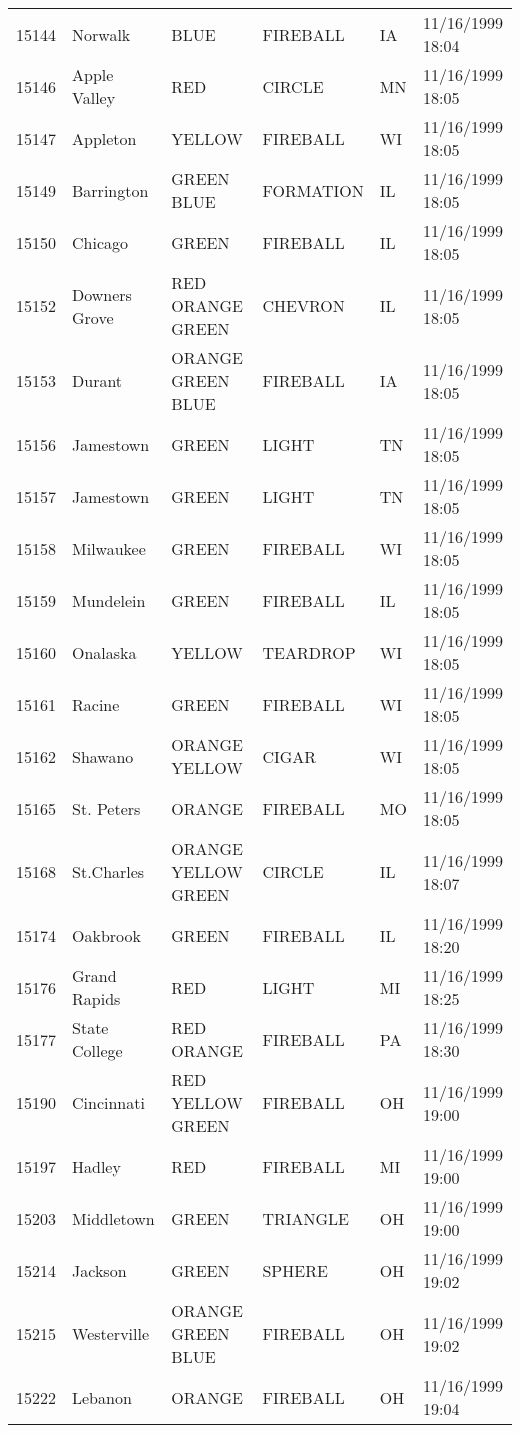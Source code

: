 \begin{tabular}{llllll}
15144 & Norwalk & BLUE & FIREBALL & IA & 11/16/1999 18:04 \\
15146 & Apple Valley & RED & CIRCLE & MN & 11/16/1999 18:05 \\
15147 & Appleton & YELLOW & FIREBALL & WI & 11/16/1999 18:05 \\
15149 & Barrington & GREEN BLUE & FORMATION & IL & 11/16/1999 18:05 \\
15150 & Chicago & GREEN & FIREBALL & IL & 11/16/1999 18:05 \\
15152 & Downers Grove & RED ORANGE GREEN & CHEVRON & IL & 11/16/1999 18:05 \\
15153 & Durant & ORANGE GREEN BLUE & FIREBALL & IA & 11/16/1999 18:05 \\
15156 & Jamestown & GREEN & LIGHT & TN & 11/16/1999 18:05 \\
15157 & Jamestown & GREEN & LIGHT & TN & 11/16/1999 18:05 \\
15158 & Milwaukee & GREEN & FIREBALL & WI & 11/16/1999 18:05 \\
15159 & Mundelein & GREEN & FIREBALL & IL & 11/16/1999 18:05 \\
15160 & Onalaska & YELLOW & TEARDROP & WI & 11/16/1999 18:05 \\
15161 & Racine & GREEN & FIREBALL & WI & 11/16/1999 18:05 \\
15162 & Shawano & ORANGE YELLOW & CIGAR & WI & 11/16/1999 18:05 \\
15165 & St. Peters & ORANGE & FIREBALL & MO & 11/16/1999 18:05 \\
15168 & St.Charles & ORANGE YELLOW GREEN & CIRCLE & IL & 11/16/1999 18:07 \\
15174 & Oakbrook & GREEN & FIREBALL & IL & 11/16/1999 18:20 \\
15176 & Grand Rapids & RED & LIGHT & MI & 11/16/1999 18:25 \\
15177 & State College & RED ORANGE & FIREBALL & PA & 11/16/1999 18:30 \\
15190 & Cincinnati & RED YELLOW GREEN & FIREBALL & OH & 11/16/1999 19:00 \\
15197 & Hadley & RED & FIREBALL & MI & 11/16/1999 19:00 \\
15203 & Middletown & GREEN & TRIANGLE & OH & 11/16/1999 19:00 \\
15214 & Jackson & GREEN & SPHERE & OH & 11/16/1999 19:02 \\
15215 & Westerville & ORANGE GREEN BLUE & FIREBALL & OH & 11/16/1999 19:02 \\
15222 & Lebanon & ORANGE & FIREBALL & OH & 11/16/1999 19:04 \\

\end{tabular}
